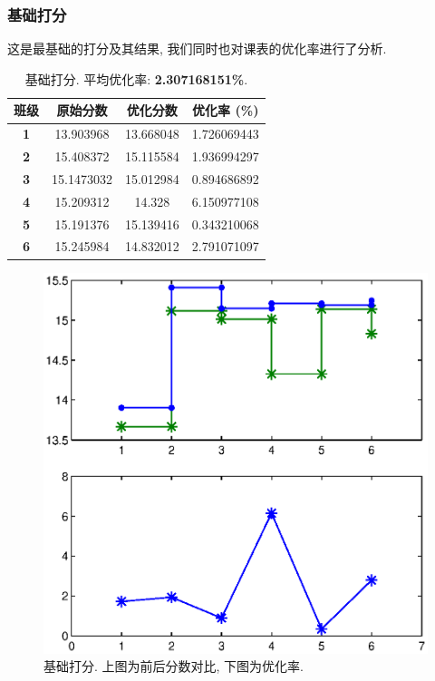 \documentclass[a4paper]{article}
\begin{document}
  \subsubsection{基础打分}
   这是最基础的打分及其结果, 我们同时也对课表的优化率进行了分析.
   \begin{table}[H]
   \centering
   \begin{tabular}{|c|c|c|c|}
   \hline
   \bf 班级 & \bf 原始分数 & \bf 优化分数 & \bf 优化率 (\%) \\\hline
   \bf 1 & 13.903968 & 13.668048 & 1.726069443 \\\hline
   \bf 2 & 15.408372 & 15.115584 & 1.936994297 \\\hline
   \bf 3 & 15.1473032 & 15.012984 & 0.894686892 \\\hline
   \bf 4 & 15.209312 & 14.328 & 6.150977108 \\\hline
   \bf 5 & 15.191376 & 15.139416 & 0.343210068 \\\hline
   \bf 6 & 15.245984 & 14.832012 & 2.791071097 \\\hline
   \end{tabular}
   \caption{基础打分. 平均优化率: \textbf{2.307168151\%}.}
   \end{table}
   \begin{figure}[H]
   \centerline{\includegraphics[scale=0.8]{mark1.eps}}
   \caption{基础打分. 上图为前后分数对比, 下图为优化率.}
   \end{figure}
   \clearpage
\end{document}
